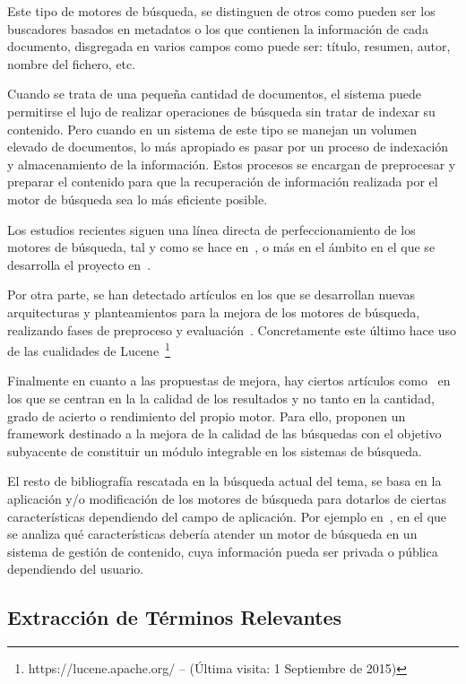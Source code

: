 \documentclass[runningheads,a4paper]{llncs}
\theoremstyle{break}
\begin{document}
Este tipo de motores de búsqueda, se distinguen de otros como pueden ser los buscadores basados en metadatos o los que contienen la información de cada documento, disgregada en varios campos como puede ser: título, resumen, autor, nombre del fichero, etc.

Cuando se trata de una pequeña cantidad de documentos, el sistema puede permitirse el lujo de realizar operaciones de búsqueda sin tratar de indexar su contenido. Pero cuando en un sistema de este tipo se manejan un volumen elevado de documentos, lo más apropiado es pasar por un proceso de indexación y almacenamiento de la información. Estos procesos se encargan de preprocesar y preparar el contenido para que la recuperación de información realizada por el motor de búsqueda sea lo más eficiente posible.

Los estudios recientes siguen una línea directa de perfeccionamiento de los motores de búsqueda, tal y como se hace en~\cite{contentsearch:1}, o más en el ámbito en el que se desarrolla el proyecto en~\cite{contentsearch:3}.

Por otra parte, se han detectado artículos en los que se desarrollan nuevas arquitecturas y planteamientos para la mejora de los motores de búsqueda, realizando fases de preproceso y evaluación~\cite{contentsearch:4}. Concretamente este último hace uso de las cualidades de Lucene~\footnote{https://lucene.apache.org/ -- (Última visita: 1 Septiembre de 2015)}

Finalmente en cuanto a las propuestas de mejora, hay ciertos artículos como~\cite{contentsearch:2} en los que se centran en la la calidad de los resultados y no tanto en la cantidad, grado de acierto o rendimiento del propio motor. Para ello, proponen un framework destinado a la mejora de la calidad de las búsquedas con el objetivo subyacente de constituir un módulo integrable en los sistemas de búsqueda.

El resto de bibliografía rescatada en la búsqueda actual del tema, se basa en la aplicación y/o modificación de los motores de búsqueda para dotarlos de ciertas características dependiendo del campo de aplicación. Por ejemplo en~\cite{contentsearch:5}, en el que se analiza qué características debería atender un motor de búsqueda en un sistema de gestión de contenido, cuya información pueda ser privada o pública dependiendo del usuario.

\subsection{Extracción de Términos Relevantes}
\end{document}
